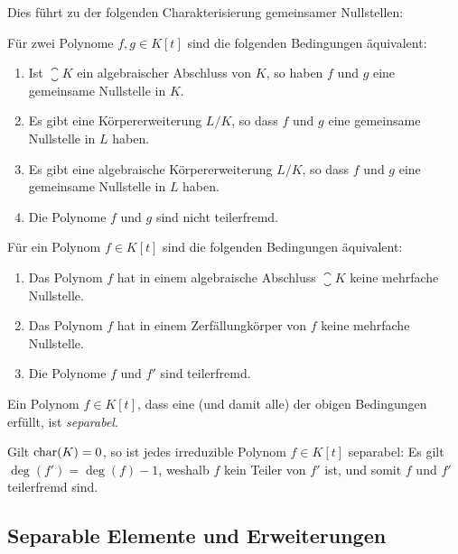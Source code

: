 Dies führt zu der folgenden Charakterisierung gemeinsamer Nullstellen:

\begin{corollary}
  Für zwei Polynome $f, g \in K[t]$ sind die folgenden Bedingungen äquivalent:
  \begin{enumerate}
    \item
      Ist $\closure{K}$ ein algebraischer Abschluss von $K$, so haben $f$ und $g$ eine gemeinsame Nullstelle in $K$.
    \item
      Es gibt eine Körpererweiterung $L/K$, so dass $f$ und $g$ eine gemeinsame Nullstelle in $L$ haben.
    \item
      Es gibt eine algebraische Körpererweiterung $L/K$, so dass $f$ und $g$ eine gemeinsame Nullstelle in $L$ haben.
    \item
      Die Polynome $f$ und $g$ sind nicht teilerfremd.
  \end{enumerate}
\end{corollary}

\begin{corollary}
  Für ein Polynom $f \in K[t]$ sind die folgenden Bedingungen äquivalent:
  \begin{enumerate}
    \item
      Das Polynom $f$ hat in einem algebraische Abschluss $\closure{K}$ keine mehrfache Nullstelle.
    \item
      Das Polynom $f$ hat in einem Zerfällungkörper von $f$ keine mehrfache Nullstelle.
    \item
      Die Polynome $f$ und $f'$ sind teilerfremd.
  \end{enumerate}
\end{corollary}

\begin{definition}
  Ein Polynom $f \in K[t]$, dass eine \textup(und damit alle\textup) der obigen Bedingungen erfüllt, ist \emph{separabel}.
\end{definition}

\begin{example}
  Gilt $\operatorname{char}(K) = 0$, so ist jedes irreduzible Polynom $f \in K[t]$ separabel:
  Es gilt $\deg(f') = \deg(f)-1$, weshalb $f$ kein Teiler von $f'$ ist, und somit $f$ und $f'$ teilerfremd sind.
\end{example}






\subsection{Separable Elemente und Erweiterungen}

